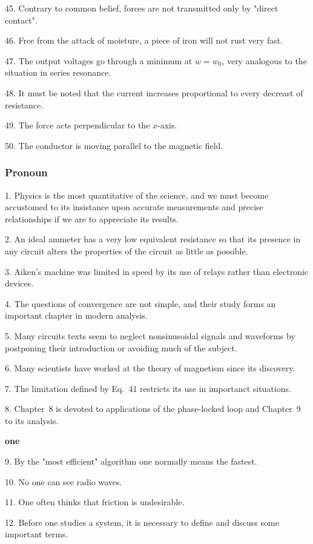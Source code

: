 \documentclass[a4paper,twocolumn,10pt]{article}
\begin{document}
\begin{CJK}{UTF8}{gkai}
	45. Contrary to common belief, forces are not transmitted only by "direct contact".

	46. Free from the attack of moisture, a piece of iron will not rust very fast.

	47. The output voltages go through a minimum at $w=w_0$, very analogous to the situation 
	in series resonance.

	48. It must be noted that the current increases proportional to every decreast of resistance.

	49. The force acts perpendicular to the $x$-axis.

	50. The conductor is moving parallel to the magnetic field.

	\subsubsection{Pronoun}

	1. Physics is the most quantitative of the science, and we must become accustomed
	to its insistance upon accurate measurements and precise relationships if we are to
	appreciate its results.

	2. An ideal ammeter has a very low equivalent resistance so that its presence in any circuit
	alters the properties of the circuit as little as possible.

	3. Aiken's machine was limited in speed by its use of relays rather than electronic devices.

	4. The questions of convergence are not simple, and their study forms an important chapter
	in modern analysis.

	5. Many circuits texts seem to neglect nonsinusoidal signals and waveforms by postponing
	their introduction or avoiding much of the subject.

	6. Many scientists have worked at the theory of magnetism since its discovery.

	7. The limitation defined by Eq.~41 restricts its use in importanct situations.

	8. Chapter~8 is devoted to applications of the phase-locked loop and Chapter~9 to its analysis.

	{\bf one}

	9. By the "most efficient" algorithm one normally means the fastest.

	10. No one can see radio waves.

	11. One often thinks that friction is undesirable.

	12. Before one studies a system, it is necessary to define and discuss some important terms.


\end{CJK}
\end{document}

